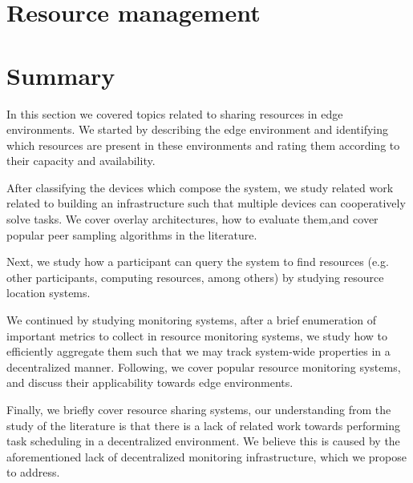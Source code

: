\section{Resource management} \label{sec:res_management} 

\section{Summary}

In this section we covered topics related to sharing resources in edge environments. We started by describing the edge environment and identifying which resources are present in these environments and rating them according to their capacity and availability. 

After classifying the devices which compose the system, we study related work related to building an infrastructure such that multiple devices can cooperatively solve tasks. We cover overlay architectures, how to evaluate them,and cover popular peer sampling algorithms in the literature. 

Next, we study how a participant can query the system to find resources (e.g. other participants, computing resources, among others) by studying resource location systems.

We continued by studying monitoring systems, after a brief enumeration of important metrics to collect in resource monitoring systems, we study how to efficiently aggregate them such that we may track system-wide properties in a decentralized manner. Following, we cover popular resource monitoring systems, and discuss their applicability towards edge environments. 

Finally, we briefly cover resource sharing systems, our understanding from the study of the literature is that there is a lack of related work towards performing task scheduling in a decentralized environment. We believe this is caused by the aforementioned lack of decentralized monitoring infrastructure, which we propose to address.

